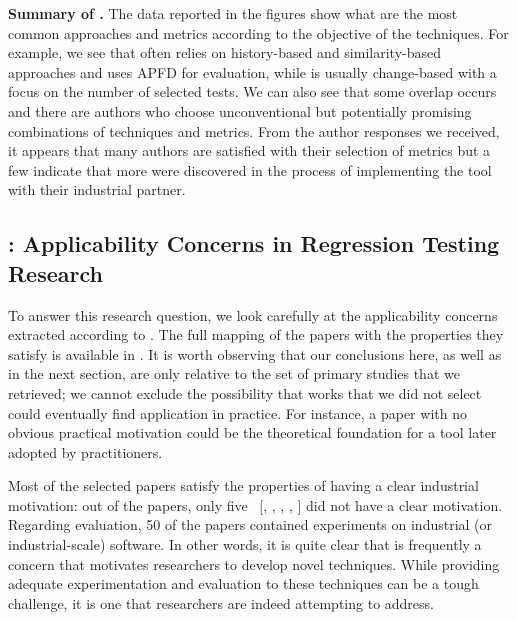 \begin{tcolorbox}%
\textbf{Summary of .} The data reported in the figures show what are the most common approaches and metrics according to the objective of the \rt techniques. For example, we see that \tcp often relies on history-based and similarity-based approaches and uses APFD for evaluation, while \tcs is usually change-based with a focus on the number of selected tests.
We can also see that some overlap occurs and there are authors who choose unconventional but potentially promising combinations of techniques and metrics.
From the author responses we received, it appears that many authors are satisfied with their selection of metrics but a few indicate that more were discovered in the process of implementing the tool with their industrial partner.
\end{tcolorbox}


\subsection{: Applicability Concerns in Regression Testing Research}
\label{sec:lit_rq2}



To answer this research question, we look carefully at the applicability concerns extracted according to .
The full mapping of the papers with the properties they satisfy is available in .
It is worth observing that our conclusions here, as well as in the next section, are only relative to the set of primary studies that we retrieved; we cannot exclude the possibility that works that we did not select could eventually find application in practice.
For instance, a paper with no obvious practical motivation could be the theoretical foundation for a tool later adopted by practitioners.

Most of the selected papers satisfy the properties of having a clear industrial motivation: out of the \numpapers papers, only five~
[, 
,
,  
, 
] did not have a clear \rea motivation.
Regarding evaluation, 50 of the papers contained experiments on industrial (or industrial-scale) software.
In other words, it is quite clear that \rea is frequently a concern that motivates researchers to develop novel \rt techniques.
While providing adequate experimentation and evaluation to these techniques can be a tough challenge, it is one that researchers are indeed attempting to address.

